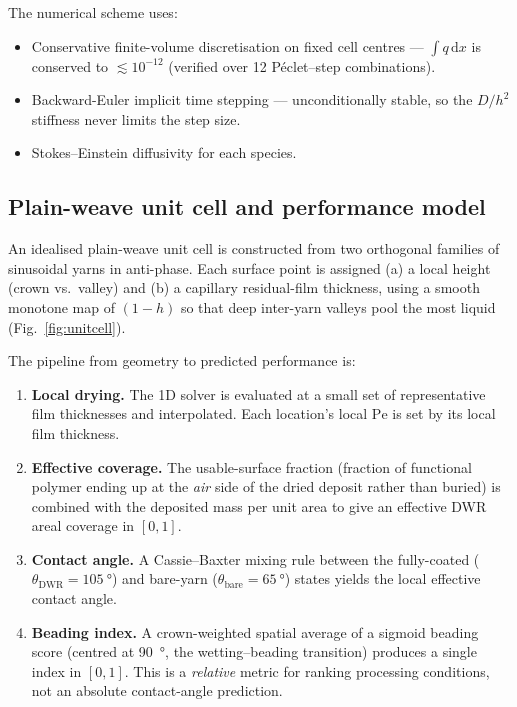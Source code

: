 \documentclass[11pt,a4paper]{article}
\begin{document}
The numerical scheme uses:
\begin{itemize}\setlength\itemsep{1pt}
  \item Conservative finite-volume discretisation on fixed cell centres —
        $\int q\,\mathrm{d}x$ is conserved to $\lesssim 10^{-12}$ (verified
        over 12 P\'{e}clet--step combinations).
  \item Backward-Euler implicit time stepping — unconditionally stable, so
        the $D/h^{2}$ stiffness never limits the step size.
  \item Stokes--Einstein diffusivity for each species.
\end{itemize}

\subsection{Plain-weave unit cell and performance model}

An idealised plain-weave unit cell is constructed from two orthogonal
families of sinusoidal yarns in anti-phase.
Each surface point is assigned (a) a local height (crown vs.\ valley) and
(b) a capillary residual-film thickness, using a smooth monotone map of
$(1-h)$ so that deep inter-yarn valleys pool the most liquid
(Fig.~\ref{fig:unitcell}).

The pipeline from geometry to predicted performance is:
\begin{enumerate}\setlength\itemsep{1pt}
  \item \textbf{Local drying.} The 1D solver is evaluated at a small set of
        representative film thicknesses and interpolated. Each location's
        local $\mathrm{Pe}$ is set by its local film thickness.
  \item \textbf{Effective coverage.} The usable-surface fraction (fraction of
        functional polymer ending up at the \emph{air} side of the dried
        deposit rather than buried) is combined with the deposited mass per
        unit area to give an effective DWR areal coverage in $[0,1]$.
  \item \textbf{Contact angle.} A Cassie--Baxter mixing rule between the
        fully-coated ($\theta_{\mathrm{DWR}}=\SI{105}{\degree}$) and
        bare-yarn ($\theta_{\mathrm{bare}}=\SI{65}{\degree}$) states yields
        the local effective contact angle.
  \item \textbf{Beading index.} A crown-weighted spatial average of a sigmoid
        beading score (centred at \SI{90}{\degree}, the wetting--beading
        transition) produces a single index in $[0,1]$.
        This is a \emph{relative} metric for ranking processing conditions,
        not an absolute contact-angle prediction.
\end{enumerate}
\end{document}
